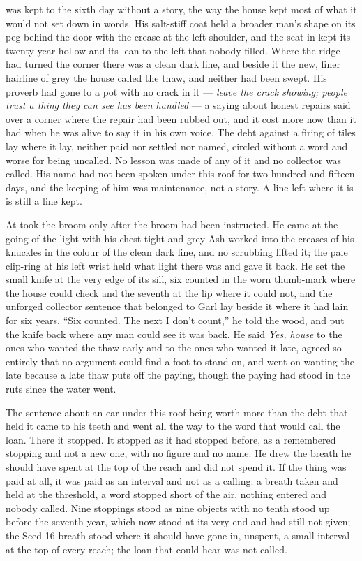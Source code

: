 \scenebreak

 was kept to the sixth day without a story, the way the house kept most of what it would not set down in words. His salt-stiff coat held a broader man's shape on its peg behind the door with the crease at the left shoulder, and the seat in  kept its twenty-year hollow and its lean to the left that nobody filled. Where the  ridge had turned the corner there was a clean dark line, and beside it the new, finer hairline of grey the house called the thaw, and neither had been swept. His proverb had gone to a pot with no crack in it --- \emph{leave the crack showing; people trust a thing they can see has been handled} --- a saying about honest repairs said over a corner where the repair had been rubbed out, and it cost more now than it had when he was alive to say it in his own voice. The debt against a firing of tiles lay where it lay, neither paid nor settled nor named, circled without a word and worse for being uncalled. No lesson was made of any of it and no collector was called. His name had not been spoken under this roof for two hundred and fifteen days, and the keeping of him was maintenance, not a story. A line left where it is is still a line kept.

\scenebreak

At   took the broom only after the broom had been instructed. He came at the going of the light with his chest tight and grey Ash worked into the creases of his knuckles in the colour of the clean dark line, and no scrubbing lifted it; the pale clip-ring at his left wrist held what light there was and gave it back. He set the small knife at the very edge of its sill, six counted in the worn thumb-mark where the house could check and the seventh at the lip where it could not, and the unforged collector sentence that belonged to Garl lay beside it where it had lain for six years. “Six counted. The next I don't count,” he told the wood, and put the knife back where any man could see it was back. He said \emph{Yes, house} to the ones who wanted the thaw early and to the ones who wanted it late, agreed so entirely that no argument could find a foot to stand on, and went on wanting the late because a late thaw puts off the paying, though the paying had stood in the ruts since the water went.

The sentence about an ear under this roof being worth more than the debt that held it came to his teeth and went all the way to the word that would call the loan. There it stopped. It stopped as it had stopped before, as a remembered stopping and not a new one, with no figure and no name. He drew the breath he should have spent at the top of the reach and did not spend it. If the thing was paid at all, it was paid as an interval and not as a calling: a breath taken and held at the threshold, a word stopped short of the air, nothing entered and nobody called. Nine stoppings stood as nine objects with no tenth stood up before the seventh year, which now stood at its very end and had still not given; the Seed 16 breath stood where it should have gone in, unspent, a small interval at the top of every reach; the loan that could hear was not called.

